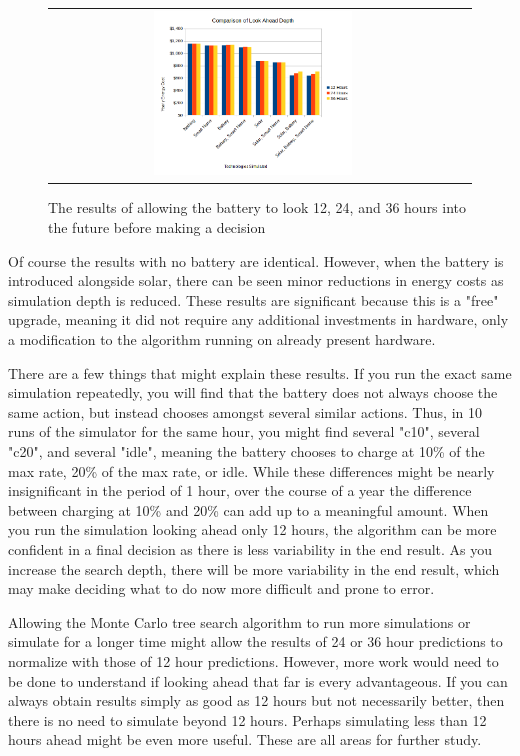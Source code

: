 \begin{figure}
 \begin{center}
  \begin{tabular}{cc}
   \includegraphics[width=0.50\textwidth]{./figures/experiment_3.png} \\
   \end{tabular}
   \end{center}
\caption{The results of allowing the battery to look 12, 24, and 36 hours into the future before making a decision}
  \vspace{+1mm}
\label{experiment_3}
\end{figure}

Of course the results with no battery are identical. However, when the battery is introduced alongside solar, there can be seen minor reductions in energy costs as simulation depth is reduced. These results are significant because this is a "free" upgrade, meaning it did not require any additional investments in hardware, only a modification to the algorithm running on already present hardware.

There are a few things that might explain these results. If you run the exact same simulation repeatedly, you will find that the battery does not always choose the same action, but instead chooses amongst several similar actions. Thus, in 10 runs of the simulator for the same hour, you might find several "c10", several "c20", and several "idle", meaning the battery chooses to charge at 10\% of the max rate, 20\% of the max rate, or idle. While these differences might be nearly insignificant in the period of 1 hour, over the course of a year the difference between charging at 10\% and 20\% can add up to a meaningful amount. When you run the simulation looking ahead only 12 hours, the algorithm can be more confident in a final decision as there is less variability in the end result. As you increase the search depth, there will be more variability in the end result, which may make deciding what to do now more difficult and prone to error.

Allowing the Monte Carlo tree search algorithm to run more simulations or simulate for a longer time might allow the results of 24 or 36 hour predictions to normalize with those of 12 hour predictions. However, more work would need to be done to understand if looking ahead that far is every advantageous. If you can always obtain results simply as good as 12 hours but not necessarily better, then there is no need to simulate beyond 12 hours. Perhaps simulating less than 12 hours ahead might be even more useful. These are all areas for further study.